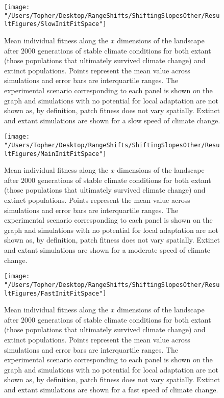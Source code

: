 \documentclass[12pt, oneside]{article}
\begin{document}
\begin{figure}
\centering
\texttt{[image: "/Users/Topher/Desktop/RangeShifts/ShiftingSlopesOther/ResultFigures/SlowInitFitSpace"]}
\vspace{-5mm}
\caption[LoF entry]{Mean individual fitness along the $x$ dimensions of the landscape after $2000$ generations of stable climate conditions for both extant (those populations that ultimately survived climate change) and extinct populations. Points represent the mean value across simulations and error bars are interquartile ranges. The experimental scenario corresponding to each panel is shown on the graph and simulations with no potential for local adaptation are not shown as, by definition, patch fitness does not vary spatially. Extinct and extant simulations are shown for a slow speed of climate change.}
\label{fig:InitFitSlow}
\end{figure}

\begin{figure}
\centering
\texttt{[image: "/Users/Topher/Desktop/RangeShifts/ShiftingSlopesOther/ResultFigures/MainInitFitSpace"]}
\caption[LoF entry]{Mean individual fitness along the $x$ dimensions of the landscape after $2000$ generations of stable climate conditions for both extant (those populations that ultimately survived climate change) and extinct populations. Points represent the mean value across simulations and error bars are interquartile ranges. The experimental scenario corresponding to each panel is shown on the graph and simulations with no potential for local adaptation are not shown as, by definition, patch fitness does not vary spatially. Extinct and extant simulations are shown for a moderate speed of climate change.}
\vspace{-5mm}
\label{fig:InitFit}
\end{figure}

\begin{figure}
\centering
\texttt{[image: "/Users/Topher/Desktop/RangeShifts/ShiftingSlopesOther/ResultFigures/FastInitFitSpace"]}
\vspace{-5mm}
\caption[LoF entry]{Mean individual fitness along the $x$ dimensions of the landscape after $2000$ generations of stable climate conditions for both extant (those populations that ultimately survived climate change) and extinct populations. Points represent the mean value across simulations and error bars are interquartile ranges. The experimental scenario corresponding to each panel is shown on the graph and simulations with no potential for local adaptation are not shown as, by definition, patch fitness does not vary spatially. Extinct and extant simulations are shown for a fast speed of climate change.}
\label{fig:InitFitFast}
\end{figure}
\end{document}

